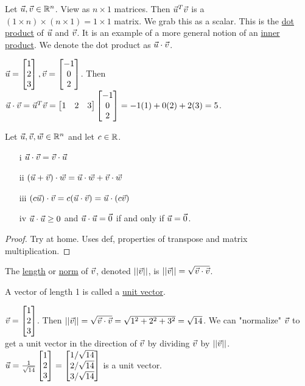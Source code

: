 \documentclass[10pt,a4paper]{article}
\begin{document}
Let $\vec{u},\vec{v}\in\mathbb{R}^n$. View as $n\times 1$ matrices. Then $\vec{u}^T\vec{v}$ is a $(1\times n)\times(n\times1) = 1\times1$ matrix. We grab this as a scalar. This is the \underline{dot product} of $\vec{u}$ and $\vec{v}$. It is an example of a more general notion of an \underline{inner product}. We denote the dot product as $\vec{u}\cdot \vec{v}$.
\begin{example}
	$\vec{u} = \begin{bmatrix}1\\2\\3\end{bmatrix},\vec{v}=\begin{bmatrix}-1\\0\\2\end{bmatrix}$. Then $\vec{u}\cdot\vec{v} = \vec{u}^T\vec{v} = \begin{bmatrix}1&2&3\end{bmatrix}\begin{bmatrix}-1\\0\\2\end{bmatrix} = -1(1)+0(2)+2(3) = 5$.
\end{example}
\begin{theorem}
	Let $\vec{u},\vec{v},\vec{w}\in\mathbb{R}^n$ and let $c\in\mathbb{R}$.
	\begin{enumerate}
		\item[i] $\vec{u}\cdot\vec{v} = \vec{v}\cdot\vec{u}$
		\item[ii] $(\vec{u}+\vec{v})\cdot\vec{w} = \vec{u}\cdot\vec{w} + \vec{v}\cdot\vec{w}$
		\item[iii] $(c\vec{u})\cdot\vec{v} = c(\vec{u}\cdot\vec{v}) = \vec{u}\cdot(c\vec{v})$
		\item[iv] $\vec{u}\cdot\vec{u} \geq 0$ and $\vec{u}\cdot\vec{u}=\vec{0}$ if and only if $\vec{u}=\vec{0}$.
	\end{enumerate}
\end{theorem}
\begin{proof}
	Try at home. Uses def, properties of transpose and matrix multiplication.
\end{proof}
\begin{definition}
	The \underline{length} or \underline{norm} of $\vec{v}$, denoted $\lvert\lvert \vec{v} \rvert\rvert$, is $||\vec{v}|| = \sqrt{\vec{v}\cdot\vec{v}}$.
\end{definition}
\begin{definition}
	A vector of length 1 is called a \underline{unit vector}.
\end{definition}
\begin{example}
	$\vec{v}=\begin{bmatrix}1\\2\\3\end{bmatrix}$. Then $||\vec{v}||=\sqrt{\vec{v}\cdot\vec{v}} = \sqrt{1^2+2^2+3^2} = \sqrt{14}$. We can "normalize" $\vec{v}$ to get a unit vector in the direction of $\vec{v}$ by dividing $\vec{v}$ by $||\vec{v}||$. $\vec{u} = \frac{1}{\sqrt{14}}\begin{bmatrix}1\\2\\3\end{bmatrix} = \begin{bmatrix}1/\sqrt{14}\\2/\sqrt{14}\\3/\sqrt{14}\end{bmatrix}$ is a unit vector.
\end{example}
\end{document}
